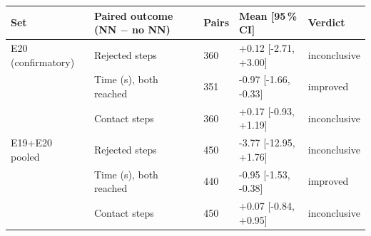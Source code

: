 \scriptsize
\setlength{\tabcolsep}{3pt}
\begin{tabular}{lllll}
\toprule
Set & Paired outcome (NN $-$ no NN) & Pairs & Mean [95\,\% CI] & Verdict \\
\midrule
E20 (confirmatory) & Rejected steps & 360 & +0.12 [-2.71, +3.00] & inconclusive \\
 & Time (s), both reached & 351 & -0.97 [-1.66, -0.33] & improved \\
 & Contact steps & 360 & +0.17 [-0.93, +1.19] & inconclusive \\
E19+E20 pooled & Rejected steps & 450 & -3.77 [-12.95, +1.76] & inconclusive \\
 & Time (s), both reached & 440 & -0.95 [-1.53, -0.38] & improved \\
 & Contact steps & 450 & +0.07 [-0.84, +0.95] & inconclusive \\
\bottomrule
\end{tabular}
